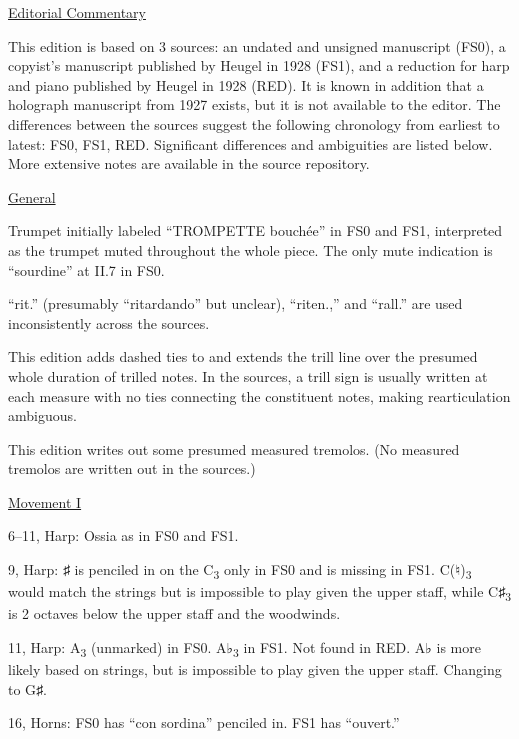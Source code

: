 \documentclass[twoside]{article}
\begin{document}
\begin{center}
\underline{\huge{Editorial Commentary}}
\end{center}

This edition is based on 3 sources: an undated and unsigned manuscript (FS0), a copyist's manuscript published by Heugel in 1928 (FS1), and a reduction for harp and piano published by Heugel in 1928 (RED). It is known in addition that a holograph manuscript from 1927 exists, but it is not available to the editor. The differences between the sources suggest the following chronology from earliest to latest: FS0, FS1, RED. Significant differences and ambiguities are listed below. More extensive notes are available in the source repository.

\begin{hangparas}{15pt}{1}
\begin{multicols}{2}

\underline{General}

Trumpet initially labeled ``TROMPETTE bouchée'' in FS0 and FS1, interpreted as the trumpet muted throughout the whole piece. The only mute indication is ``sourdine'' at II.7 in FS0.

``rit.'' (presumably ``ritardando'' but unclear), ``riten.,'' and ``rall.'' are used inconsistently across the sources.

This edition adds dashed ties to and extends the trill line over the presumed whole duration of trilled notes. In the sources, a trill sign is usually written at each measure with no ties connecting the constituent notes, making rearticulation ambiguous.

This edition writes out some presumed measured tremolos. (No measured tremolos are written out in the sources.)

\underline{Movement I}

6--11, Harp: Ossia as in FS0 and FS1.

9, Harp: ♯ is penciled in on the C\textsubscript{3} only in FS0 and is missing in FS1. C(♮)\textsubscript{3} would match the strings but is impossible to play given the upper staff, while C♯\textsubscript{3} is 2 octaves below the upper staff and the woodwinds.

11, Harp: A\textsubscript{3} (unmarked) in FS0. A♭\textsubscript{3} in FS1. Not found in RED. A♭ is more likely based on strings, but is impossible to play given the upper staff. Changing to G♯.

16, Horns: FS0 has ``con sordina'' penciled in. FS1 has ``ouvert.''


\end{multicols}
\end{hangparas}
\end{document}
